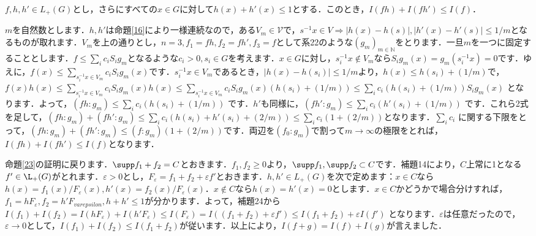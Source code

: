 \begin{Proof}
\begin{lem}\label{24}
$f, h, h'\in L_{+}(G)$とし，さらにすべての$x \in G$に対して$h(x)+h'(x) \le 1$とする．このとき，$I(fh)+I(fh') \le I(f)$．
\end{lem}
\begin{Proof}
$m$を自然数とします．$h,h'$は命題\ref{16}により一様連続なので，ある$V_m \in \mathscr{V}$で，$s^{-1}x \in V \Rightarrow |h(x)-h(s)|, |h'(x)-h'(s)| \le 1/m$となるものが取れます．$V_m$を上の通りとし，$n=3, f_1=fh, f_2=fh', f_3=f$として系22のような$(g_m)_{m \in \mathbb{N}}$をとります．一旦$m$を一つに固定することとします．$f \le \sum_{i}c_i S_{i}g_m$となるような$c_i>0, s_i \in G$を考えます．$x \in G$に対し，$s_{i}^{-1}x \not\in V_m$なら$S_{i}g_{m}(x)=g_{m}(s_{i}^{-1}x)=0$です．ゆえに，$f(x) \le \sum_{s_{i}^{-1}x \in V_m} c_{i}S_{i}g_{m}(x)$です．$s_{i}^{-1}x \in V_m$であるとき，$|h(x)-h(s_i)| \le 1/m$より，$h(x) \le h(s_i)+(1/m)$で，$f(x)h(x) \le \sum_{s_{i}^{-1}x \in V_m} c_{i}S_{i}g_{m}(x)h(x) \le \sum_{s_{i}^{-1}x \in V_m} c_{i}S_{i}g_{m}(x)(h(s_i)+(1/m)) \le \sum_{i}c_{i}( h(s_i)+(1/m) )S_{i}g_{m}(x)$ となります．よって，$( fh \colon g_m ) \le \sum_{i}c_{i} ( h(s_i)+(1/m) )$ です．$h'$も同様に，$( fh' \colon g_m ) \le \sum_{i}c_{i} ( h'(s_i)+(1/m) )$ です．これら2式を足して，$( fh \colon g_m )+( fh' \colon g_m ) \le \sum_{i}c_{i} ( h(s_i)+h'(s_i)+(2/m) ) \le \sum_{i}c_{i} ( 1+(2/m) )$となります．$\sum_{i}c_{i}$ に関する下限をとって，$( fh \colon g_m )+( fh' \colon g_m ) \le ( f \colon g_m ) ( 1+(2/m) )$です．両辺を$(f_0 \colon g_m)$で割って$m \to \infty$の極限をとれば，$I(fh)+I(fh') \le I(f)$となります．　
\end{Proof}
命題\ref{23}の証明に戻ります．$\supp f_{1}+f_{2}=C$とおきます．$f_1, f_2 \ge 0$より，$\supp f_1, \supp f_2 \subset C$です．補題14により，$C$上常に1となる$f' \in \L_{+}(G)$がとれます．$\varepsilon>0$とし，$F_{\varepsilon}=f_{1}+f_{2}+\varepsilon f'$とおきます．$h,h' \in L_{+}(G)$を次で定めます：$x \in C$なら$h(x)=f_{1}(x)/F_{\varepsilon}(x), h'(x)=f_{2}(x)/F_{\varepsilon}(x)$．$x \not\in C$なら$h(x)=h'(x)=0$とします．$x \in C$かどうかで場合分けすれば，$f_{1}=hF_{\varepsilon}, f_{2}=h'F_{varepsilon}, h+h' \le 1$が分かります．よって，補題24から$I(f_1)+I(f_2) = I(hF_{\varepsilon})+I(h'F_{\varepsilon}) \le I(F_{\varepsilon})=I ( (f_{1}+f_{2})+\varepsilon f' ) \le I(f_{1}+f_{2})+ \varepsilon I(f')$ となります．$\varepsilon$は任意だったので，$\varepsilon \to 0$として，$I(f_1)+I(f_2) \le I(f_{1}+f_{2})$が従います．以上により，$I(f+g)=I(f)+I(g)$が言えました．　
\end{Proof}

